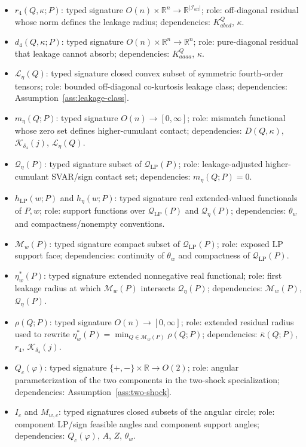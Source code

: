 \documentclass[11pt]{article}
\newcommand{\R}{\mathbb{R}}
\theoremstyle{definition}
\theoremstyle{plain}
\theoremstyle{remark}
\begin{document}
\begin{itemize}[leftmargin=*]
  \item \(r_4(Q,\kappa;P)\): typed signature \(O(n)\times\R^n\to\R^{|\mathcal I_{\mathrm{off}}|}\); role: off-diagonal residual whose norm defines the leakage radius; dependencies: \(K^Q_{abcd}\), \(\kappa\).
  \item \(d_4(Q,\kappa;P)\): typed signature \(O(n)\times\R^n\to\R^n\); role: pure-diagonal residual that leakage cannot absorb; dependencies: \(K^Q_{aaaa}\), \(\kappa\).
  \item \(\mathcal L_\eta(Q)\): typed signature closed convex subset of symmetric fourth-order tensors; role: bounded off-diagonal co-kurtosis leakage class; dependencies: Assumption~\ref{ass:leakage-class}.
  \item \(m_\eta(Q;P)\): typed signature \(O(n)\to[0,\infty]\); role: mismatch functional whose zero set defines higher-cumulant contact; dependencies: \(D(Q,\kappa)\), \(\mathcal K_{\delta_4}(j)\), \(\mathcal L_\eta(Q)\).
  \item \(\mathcal Q_\eta(P)\): typed signature subset of \(\mathcal Q_{\mathrm{LP}}(P)\); role: leakage-adjusted higher-cumulant SVAR/sign contact set; dependencies: \(m_\eta(Q;P)=0\).
  \item \(h_{\mathrm{LP}}(w;P)\) and \(h_\eta(w;P)\): typed signature real extended-valued functionals of \(P,w\); role: support functions over \(\mathcal Q_{\mathrm{LP}}(P)\) and \(\mathcal Q_\eta(P)\); dependencies: \(\theta_w\) and compactness/nonempty conventions.
  \item \(\mathcal M_w(P)\): typed signature compact subset of \(\mathcal Q_{\mathrm{LP}}(P)\); role: exposed LP support face; dependencies: continuity of \(\theta_w\) and compactness of \(\mathcal Q_{\mathrm{LP}}(P)\).
  \item \(\eta_w^*(P)\): typed signature extended nonnegative real functional; role: first leakage radius at which \(\mathcal M_w(P)\) intersects \(\mathcal Q_\eta(P)\); dependencies: \(\mathcal M_w(P)\), \(\mathcal Q_\eta(P)\).
  \item \(\rho(Q;P)\): typed signature \(O(n)\to[0,\infty]\); role: extended residual radius used to rewrite \(\eta_w^*(P)=\min_{Q\in\mathcal M_w(P)}\rho(Q;P)\); dependencies: \(\bar\kappa(Q;P)\), \(r_4\), \(\mathcal K_{\delta_4}(j)\).
  \item \(Q_c(\varphi)\): typed signature \(\{+,-\}\times\R\to O(2)\); role: angular parameterization of the two components in the two-shock specialization; dependencies: Assumption~\ref{ass:two-shock}.
  \item \(I_c\) and \(M_{w,c}\): typed signatures closed subsets of the angular circle; role: component LP/sign feasible angles and component support angles; dependencies: \(Q_c(\varphi)\), \(A\), \(Z\), \(\theta_w\).

\end{itemize}
\end{document}
